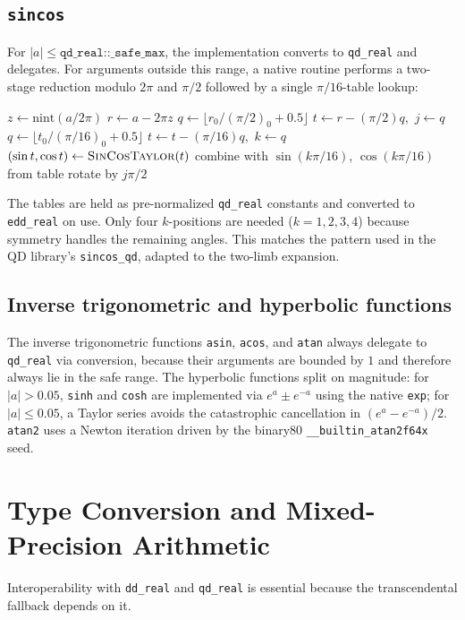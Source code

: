 \documentclass[11pt,a4paper]{article}
\begin{document}
\subsection{\texttt{sincos}}

For $|a| \le \texttt{qd\_real::\_safe\_max}$, the implementation
converts to \texttt{qd\_real} and delegates.  For arguments
outside this range, a native routine performs a two-stage
reduction modulo $2\pi$ and $\pi/2$ followed by a single
$\pi/16$-table lookup:

\begin{algorithmic}[1]
\State $z \gets \mathrm{nint}(a / 2\pi)$
\State $r \gets a - 2\pi z$
\State $q \gets \lfloor r_0 / (\pi/2)_0 + 0.5 \rfloor$
\State $t \gets r - (\pi/2) q$,\ $j \gets q$
\State $q \gets \lfloor t_0 / (\pi/16)_0 + 0.5 \rfloor$
\State $t \gets t - (\pi/16) q$,\ $k \gets q$
\State $(\sin t, \cos t) \gets \textsc{SinCosTaylor}(t)$
\State combine with $\sin(k\pi/16)$, $\cos(k\pi/16)$ from table
\State rotate by $j\pi/2$
\end{algorithmic}
The tables are held as pre-normalized \texttt{qd\_real} constants
and converted to \texttt{edd\_real} on use.  Only four
$k$-positions are needed ($k = 1,2,3,4$) because symmetry handles
the remaining angles.  This matches the pattern used in the QD
library's \texttt{sincos\_qd}, adapted to the two-limb expansion.

\subsection{Inverse trigonometric and hyperbolic functions}

The inverse trigonometric functions \texttt{asin}, \texttt{acos},
and \texttt{atan} always delegate to \texttt{qd\_real} via
conversion, because their arguments are bounded by $1$ and
therefore always lie in the safe range.  The hyperbolic functions
split on magnitude: for $|a| > 0.05$, \texttt{sinh} and
\texttt{cosh} are implemented via $e^a \pm e^{-a}$ using the
native \texttt{exp}; for $|a| \le 0.05$, a Taylor series avoids
the catastrophic cancellation in $(e^a - e^{-a})/2$.
\texttt{atan2} uses a Newton iteration driven by the binary80
\verb|__builtin_atan2f64x| seed.

\section{Type Conversion and Mixed-Precision Arithmetic}
\label{sec:mixed}

Interoperability with \texttt{dd\_real} and \texttt{qd\_real} is
essential because the transcendental fallback depends on it.
\end{document}
